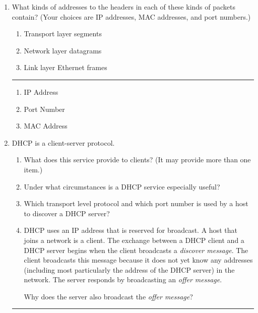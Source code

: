 \documentclass[twoside]{article}
\newenvironment{answer}
  {\vspace*{0.2cm} \rule{12cm}{0.04cm} \vspace*{0.2cm}}
  {\vspace*{0.2cm}}
\begin{document}
\begin{enumerate}
  \item What kinds of addresses to the headers in each of these kinds
      of packets contain? (Your choices are IP addresses, MAC addresses,
      and port numbers.)
  \begin{enumerate}
    \item Transport layer segments
    \item Network layer datagrams
    \item Link layer Ethernet frames
    \end{enumerate}

  \begin{answer}

  \begin{enumerate}
    \item IP Address
    \item Port Number
    \item MAC Address
    \end{enumerate}

    \end{answer}

  \item DHCP is a client-server protocol.
  \begin{enumerate}
    \item What does this service provide to clients? (It may provide more than one item.) 
    \item Under what circumstances is a DHCP service especially useful?
    \item Which transport level protocol and which port number is used by
      a host to discover a DHCP server?
    \item DHCP uses an IP address that is reserved for broadcast. 
      A host that joins a network is a client.
      The exchange between a DHCP client and a DHCP server begins when
      the client broadcasts a \emph{discover message}.
      The client broadcasts this message because it does not yet know
      any addresses (including most particularly the address of the DHCP
      server) in the network.
      The server responds by broadcasting an \emph{offer message}.

      Why does the server also broadcast the \emph{offer message}?

    \end{enumerate}

  \begin{answer}


\end{answer}
\end{enumerate}
\end{document}
